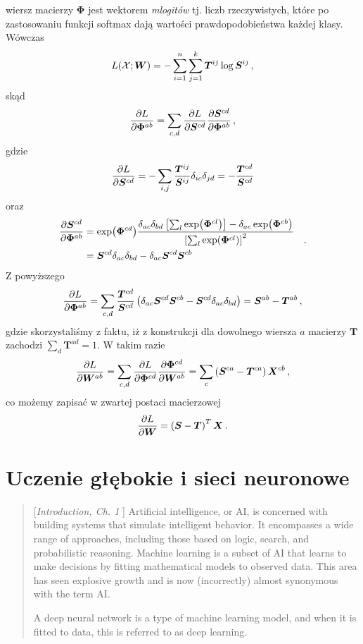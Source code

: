 \documentclass{myclass}
\numberwithin{equation}{subsection}
\begin{document}
wiersz macierzy \(\bm{\Phi}\) jest wektorem \emph{mlogitów} tj. liczb rzeczywistych, które po
zastosowaniu funkcji softmax dają wartości prawdopodobieństwa każdej klasy. Wówczas
\[
L(\mathcal{X}; \bm{W}) = - \sum_{i=1}^n \sum_{j=1}^k \bm{T}^{ij} \log \bm{S}^{ij}\,,
\]
skąd
\[
\pdv{L}{\bm{\Phi}^{ab}} = \sum_{c,d} \pdv{L}{\bm{S}^{cd}}\pdv{\bm{S}^{cd}}{\bm{\Phi}^{ab}}\,,
\]
gdzie
\[
\pdv{L}{\bm{S}^{cd}} = - \sum_{i,j} \frac{\bm{T}^{ij}}{\bm{S}^{ij}} \delta_{ic} \delta_{jd} = -\frac{\bm{T}^{cd}}{\bm{S}^{cd}}
\]
oraz
\[
\begin{split}
\pdv{\bm{S}^{cd}}{\bm{\Phi}^{ab}} &= \exp(\bm{\Phi}^{cd}) \frac{ \delta_{ac} \delta_{bd} \left[\sum_l \exp(\bm{\Phi}^{cl})\right] - \delta_{ac} \exp(\bm{\Phi}^{cb})}{\left[\sum_l \exp(\bm{\Phi}^{cl})\right]^2}\\
                                       &= \bm{S}^{cd} \delta_{ac} \delta_{bd} - \delta_{ac} \bm{S}^{cd} \bm{S}^{cb} 
\end{split}\quad.
\]
Z powyższego
\[
\pdv{L}{\bm{\Phi}^{ab}} = \sum_{c,d} \frac{\bm{T}^{cd}}{\bm{S}^{cd}} \left( \delta_{ac} \bm{S}^{cd} \bm{S}^{cb} - \bm{S}^{cd} \delta_{ac} \delta_{bd} \right) = \bm{S}^{ab} - \bm{T}^{ab}\,,
\]
gdzie skorzystaliśmy z faktu, iż z konstrukcji dla dowolnego wiersza \(a\) macierzy \(\bm{T}\)
zachodzi \(\sum_{d}\bm{T}^{ad} = 1\). W takim razie
\[
\pdv{L}{\bm{W}^{ab}} = \sum_{c,d} \pdv{L}{\bm{\Phi}^{cd}} \pdv{\bm{\Phi}^{cd}}{\bm{W}^{ab}} = \sum_c \left(\bm{S}^{ca} - \bm{T}^{ca}\right) \bm{X}^{cb} \,,
\]
co możemy zapisać w zwartej postaci macierzowej
\[
\pdv{L}{\bm{W}} = \left(\bm{S} - \bm{T}\right)^T \bm{X}\,.
\]


\section{Uczenie głębokie i sieci neuronowe}

\begin{quote}[\textit{Introduction, Ch. 1} \cite{prince2023understanding}]
Artificial intelligence, or AI, is concerned with building systems that simulate intelligent
behavior. It encompasses a wide range of approaches, including those based on logic, search, and
probabilistic reasoning. Machine learning is a subset of AI that learns to make decisions by fitting
mathematical models to observed data. This area has seen explosive growth and is now (incorrectly)
almost synonymous with the term AI.

A deep neural network is a type of machine learning model, and when it is fitted to data, this is
referred to as deep learning.
\end{quote}
\end{document}
